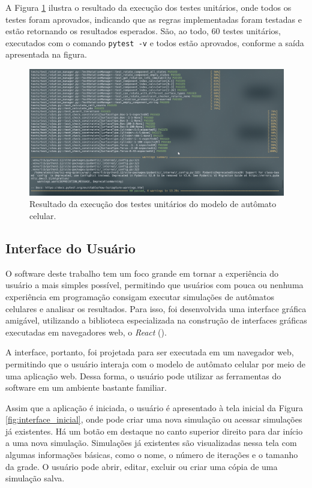 \documentclass[12pt,oneside]{report}
\begin{document}
A Figura \ref{fig:unit_tests} ilustra o resultado da execução dos testes unitários, onde todos os testes foram aprovados, indicando que as regras implementadas foram testadas e estão retornando os resultados esperados. São, ao todo, 60 testes unitários, executados com o comando \texttt{pytest -v} e todos estão aprovados, conforme a saída apresentada na figura.

\begin{figure}[H]
    \centering
    \includegraphics[width=1\textwidth]{img/unit_test.png}
    \caption{\small Resultado da execução dos testes unitários do modelo de autômato celular.}
    \label{fig:unit_tests}
\end{figure}

\subsection{Interface do Usuário}

O software deste trabalho tem um foco grande em tornar a experiência do usuário a mais simples possível, permitindo que usuários com pouca ou nenhuma experiência em programação consigam executar simulações de autômatos celulares e analisar os resultados. Para isso, foi desenvolvida uma interface gráfica amigável, utilizando a biblioteca especializada na construção de interfaces gráficas executadas em navegadores web, o \textit{React} ().

A interface, portanto, foi projetada para ser executada em um navegador web, permitindo que o usuário interaja com o modelo de autômato celular por meio de uma aplicação web. Dessa forma, o usuário pode utilizar as ferramentas do software em um ambiente bastante familiar.

Assim que a aplicação é iniciada, o usuário é apresentado à tela inicial da Figura \ref{fig:interface_inicial}, onde pode criar uma nova simulação ou acessar simulações já existentes. Há um botão em destaque no canto superior direito para dar início a uma nova simulação. Simulações já existentes são visualizadas nessa tela com algumas informações básicas, como o nome, o número de iterações e o tamanho da grade. O usuário pode abrir, editar, excluir ou criar uma cópia de uma simulação salva.
\end{document}
